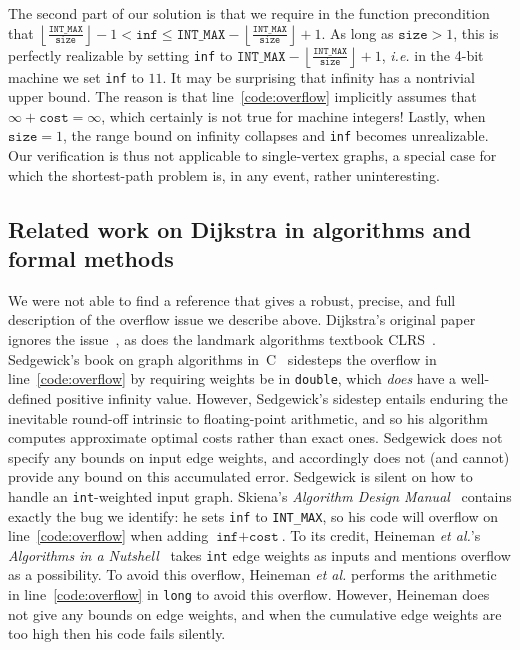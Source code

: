The second part of our solution is that we require in the function precondition that $\left\lfloor \frac{\texttt{INT\_MAX}}{\texttt{size}} \right\rfloor - 1 < \texttt{inf} \le \texttt{INT\_MAX} - \left\lfloor \frac{\texttt{INT\_MAX}}{\texttt{size}} \right\rfloor + 1$.  As long as $\texttt{size} > 1$, this is perfectly realizable  by setting \texttt{inf} to $\texttt{INT\_MAX} - \left\lfloor \frac{\texttt{INT\_MAX}}{\texttt{size}} \right\rfloor + 1$, \emph{i.e.} in the 4-bit machine we set \texttt{inf} to $11$.  It may be surprising that infinity has a nontrivial upper bound.  The reason is that line~\ref{code:overflow} implicitly assumes that $\infty + \texttt{cost} = \infty$, which certainly is not true for machine integers!
Lastly, when $\texttt{size} = 1$, the range bound on infinity collapses and \texttt{inf} becomes unrealizable.
Our verification is thus not applicable to single-vertex graphs, a special case for which the shortest-path problem is, in any event, rather uninteresting.

\subsection{Related work on Dijkstra in algorithms and formal methods}
\label{sec:relworkdijkstra}
We were not able to find a reference that gives a robust, precise,
and full description of the overflow issue we describe above.
Dijkstra's original paper ignores the issue~\cite{DBLP:journals/nm/Dijkstra59}, as does the landmark algorithms textbook CLRS~\cite{clrs}. %
Sedgewick's book on graph algorithms in~C~\cite{sedgewick} sidesteps the overflow in line~\ref{code:overflow} by requiring weights be in \texttt{double}, which \emph{does} have a well-defined positive infinity value.  However, Sedgewick's sidestep entails enduring the inevitable round-off intrinsic to floating-point arithmetic, and so his algorithm computes approximate optimal costs rather than exact ones.  Sedgewick does not specify any bounds on input edge weights, and accordingly does not (and cannot) provide any bound on this accumulated error.  Sedgewick is silent on how to handle an \texttt{int}-weighted input graph.  Skiena's \emph{Algorithm Design Manual}~\cite{DBLP:books/daglib/0022194} contains exactly the bug we identify: he sets \texttt{inf} to \texttt{INT\_MAX}, so his code will overflow on
line~\ref{code:overflow} when adding $\texttt{inf} + \texttt{cost}$.
To its credit, Heineman \emph{et al.}'s \emph{Algorithms in a Nutshell}~\cite{heineman2008algorithms} takes \texttt{int} edge weights as inputs and mentions overflow as a possibility.  To avoid this overflow, Heineman \emph{et al.} performs the arithmetic in line~\ref{code:overflow} in \texttt{long} to avoid this overflow.  However, Heineman does not give any bounds on edge weights, and when the cumulative edge weights are too high then his code fails silently. %

